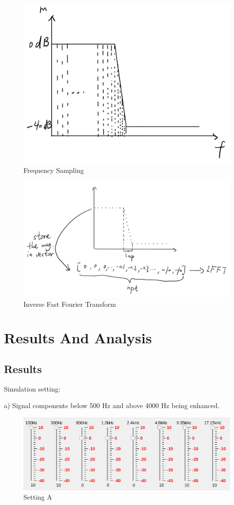 \documentclass[titlepage]{article}
\begin{document}
\begin{figure}[htbp]
\centering
\includegraphics[width=.9\linewidth]{a.png}
\caption{Frequency Sampling}
\end{figure}
\begin{figure}[htbp]
\centering
\includegraphics[width=.9\linewidth]{b.png}
\caption{Inverse Fast Fourier Transform}
\end{figure}

\section{Results And Analysis}
\label{sec:orgabfd3f8}
\subsection{Results}
\label{sec:org9c0b075}
Simulation setting: 

a) Signal components below 500 Hz and above 4000 Hz being
enhanced.

\begin{figure}[htbp]
\centering
\includegraphics[width=.9\linewidth]{setting_a.png}
\caption{Setting A}
\end{figure}
\end{document}
